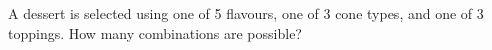 A dessert is selected using one of 5 flavours, one of 3 cone types, and one of 3 toppings. How many combinations are possible?
